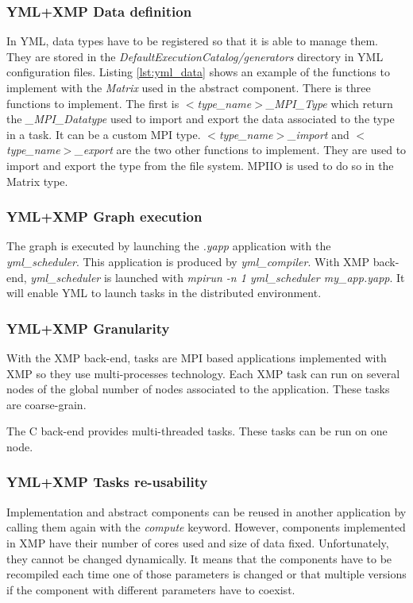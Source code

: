 

\subsubsection{YML+XMP Data definition}
In YML, data types have to be registered so that it is able to manage them.
They are stored in the \textit{DefaultExecutionCatalog/generators} directory in YML configuration files.
Listing \ref{lst:yml_data} shows an example of the functions to implement with the \textit{Matrix} used in the abstract component.
There is three functions to implement.
The first is \textit{$<$type\_name$>$\_MPI\_Type} which return the \textit{\_MPI\_Datatype} used to import and export the data associated to the type in a task.
It can be a custom MPI type.
\textit{$<$type\_name$>$\_import} and \textit{$<$type\_name$>$\_export} are the two other functions to implement.
They are used to import and export the type from the file system.
MPIIO is used to do so in the Matrix type.



\subsubsection{YML+XMP Graph execution}
The graph is executed by launching the \textit{.yapp} application with the \textit{yml\_scheduler}.
This application is produced by \textit{yml\_compiler}.
With XMP back-end, \textit{yml\_scheduler} is launched with \textit{mpirun -n 1 yml\_scheduler my\_app.yapp}.
It will enable YML to launch tasks in the distributed environment.

\subsubsection{YML+XMP Granularity}
With the XMP back-end, tasks are MPI based applications implemented with XMP so they use multi-processes technology.
Each XMP task can run on several nodes of the global number of nodes associated to the application.
These tasks are coarse-grain.

The C back-end provides multi-threaded tasks.
These tasks can be run on one node.

\subsubsection{YML+XMP Tasks re-usability}
Implementation and abstract components can be reused in another application by calling them again with the \textit{compute} keyword.
However, components implemented in XMP have their number of cores used and size of data fixed.
Unfortunately, they cannot be changed dynamically.
It means that the components have to be recompiled each time one of those parameters is changed or that multiple versions if the component with different parameters have to coexist.

